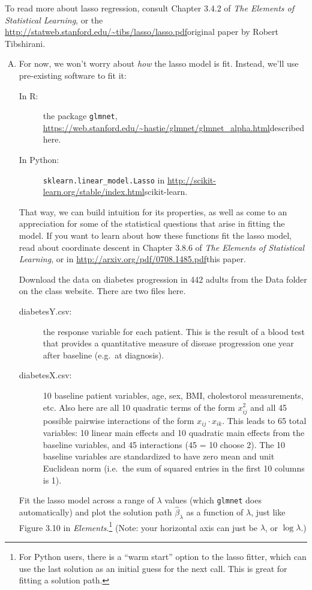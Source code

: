 \documentclass{article}
\begin{document}
To read more about lasso regression, consult Chapter 3.4.2 of \textit{The Elements of Statistical Learning}, or the \url{http://statweb.stanford.edu/~tibs/lasso/lasso.pdf}{original paper} by Robert Tibshirani.

\begin{enumerate}[(A)]

\item For now, we won't worry about \textit{how} the lasso model is fit.  Instead, we'll use pre-existing software to fit it:
\begin{description}
\item[In R:] the package \verb|glmnet|, \url{https://web.stanford.edu/~hastie/glmnet/glmnet_alpha.html}{described here}.
\item[In Python:] \verb|sklearn.linear_model.Lasso| in \url{http://scikit-learn.org/stable/index.html}{scikit-learn}.
\end{description}
That way, we can build intuition for its properties, as well as come to an appreciation for some of the statistical questions that arise in fitting the model.  If you want to learn about how these functions fit the lasso model, read about coordinate descent in Chapter 3.8.6 of \textit{The Elements of Statistical Learning}, or in \url{http://arxiv.org/pdf/0708.1485.pdf}{this paper}.

Download the data on diabetes progression in 442 adults from the Data folder on the class website.  There are two files here.
\begin{description}
\item[diabetesY.csv:] the response variable for each patient.  This is the result of a blood test that provides a quantitative measure of disease progression one year after baseline (e.g.~at diagnosis).
\item[diabetesX.csv:] 10 baseline patient variables, age, sex, BMI, cholestorol measurements, etc.  Also here are all 10 quadratic terms of the form $x_{ij}^2$ and all 45 possible pairwise interactions of the form $x_{ij} \cdot x_{ik}$.  This leads to 65 total variables: 10 linear main effects and 10 quadratic main effects from the baseline variables, and 45 interactions (45 = 10 choose 2).  The 10  baseline variables are standardized to have zero mean and unit Euclidean norm (i.e.~the sum of squared entries in the first 10 columns is 1).
\end{description}

Fit the lasso model across a range of $\lambda$ values (which \verb|glmnet| does automatically) and plot the solution path $\hat{\beta}_{\lambda}$ as a function of $\lambda$, just like Figure 3.10 in \textit{Elements}.\footnote{For Python users, there is a ``warm start'' option to the lasso fitter, which can use the last solution as an initial guess for the next call.  This is great for fitting a solution path.}  (Note: your horizontal axis can just be $\lambda$, or $\log \lambda$.)


\end{enumerate}
\end{document}
